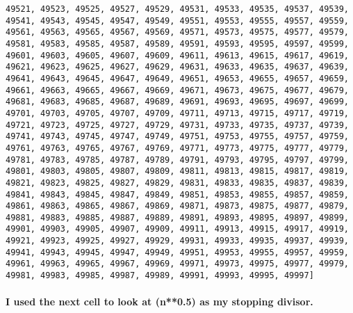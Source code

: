 \documentclass[11pt]{article}
\begin{document}
\begin{Verbatim}[commandchars=\\\{\}]
49521, 49523, 49525, 49527, 49529, 49531, 49533, 49535, 49537, 49539, 49541, 49543, 49545, 49547, 49549, 49551, 49553, 49555, 49557, 49559, 49561, 49563, 49565, 49567, 49569, 49571, 49573, 49575, 49577, 49579, 49581, 49583, 49585, 49587, 49589, 49591, 49593, 49595, 49597, 49599, 49601, 49603, 49605, 49607, 49609, 49611, 49613, 49615, 49617, 49619, 49621, 49623, 49625, 49627, 49629, 49631, 49633, 49635, 49637, 49639, 49641, 49643, 49645, 49647, 49649, 49651, 49653, 49655, 49657, 49659, 49661, 49663, 49665, 49667, 49669, 49671, 49673, 49675, 49677, 49679, 49681, 49683, 49685, 49687, 49689, 49691, 49693, 49695, 49697, 49699, 49701, 49703, 49705, 49707, 49709, 49711, 49713, 49715, 49717, 49719, 49721, 49723, 49725, 49727, 49729, 49731, 49733, 49735, 49737, 49739, 49741, 49743, 49745, 49747, 49749, 49751, 49753, 49755, 49757, 49759, 49761, 49763, 49765, 49767, 49769, 49771, 49773, 49775, 49777, 49779, 49781, 49783, 49785, 49787, 49789, 49791, 49793, 49795, 49797, 49799, 49801, 49803, 49805, 49807, 49809, 49811, 49813, 49815, 49817, 49819, 49821, 49823, 49825, 49827, 49829, 49831, 49833, 49835, 49837, 49839, 49841, 49843, 49845, 49847, 49849, 49851, 49853, 49855, 49857, 49859, 49861, 49863, 49865, 49867, 49869, 49871, 49873, 49875, 49877, 49879, 49881, 49883, 49885, 49887, 49889, 49891, 49893, 49895, 49897, 49899, 49901, 49903, 49905, 49907, 49909, 49911, 49913, 49915, 49917, 49919, 49921, 49923, 49925, 49927, 49929, 49931, 49933, 49935, 49937, 49939, 49941, 49943, 49945, 49947, 49949, 49951, 49953, 49955, 49957, 49959, 49961, 49963, 49965, 49967, 49969, 49971, 49973, 49975, 49977, 49979, 49981, 49983, 49985, 49987, 49989, 49991, 49993, 49995, 49997]

    \end{Verbatim}

    \hypertarget{i-used-the-next-cell-to-look-at-n0.5-as-my-stopping-divisor.}{%
\paragraph{I used the next cell to look at (n**0.5) as my stopping
divisor.}\label{i-used-the-next-cell-to-look-at-n0.5-as-my-stopping-divisor.}}
\end{document}
